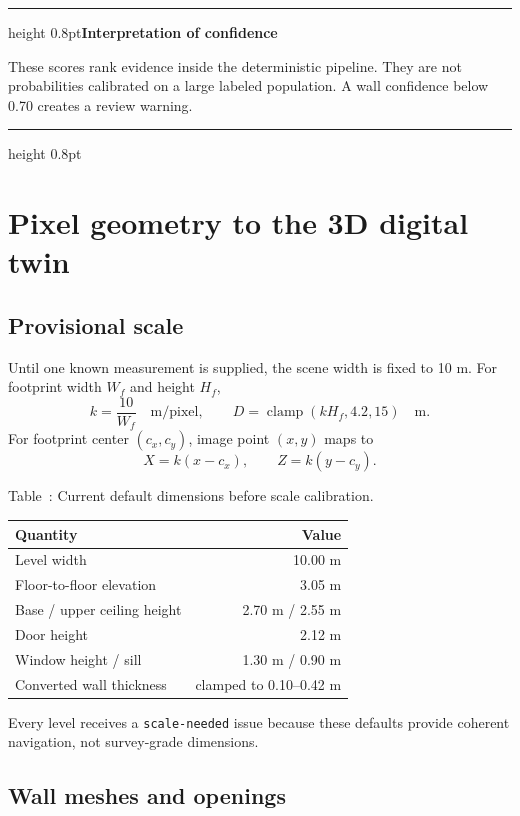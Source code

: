 \documentclass[11pt,a4paper]{article}
\newcommand{\code}[1]{\texttt{#1}}
\newcommand{\clamp}{\operatorname{clamp}}
\newenvironment{warningbox}[1]{
  \par\medskip\noindent\begin{minipage}{\textwidth}
  \color{Orange}\hrule height 0.8pt\vspace{1.6mm}\textbf{#1}\par\smallskip\color{Ink}
}{
  \vspace{1.3mm}\color{Orange}\hrule height 0.8pt\end{minipage}\par\medskip
}
\begin{document}
\begin{warningbox}{Interpretation of confidence}
These scores rank evidence inside the deterministic pipeline. They are not probabilities calibrated on a large labeled population. A wall confidence below 0.70 creates a review warning.
\end{warningbox}

\section{Pixel geometry to the 3D digital twin}

\subsection{Provisional scale}

Until one known measurement is supplied, the scene width is fixed to 10 m. For footprint width $W_f$ and height $H_f$,
\begin{equation}
k=\frac{10}{W_f}\quad\text{m/pixel},\qquad
D=\clamp(kH_f,4.2,15)\quad\text{m}.
\end{equation}
For footprint center $(c_x,c_y)$, image point $(x,y)$ maps to
\begin{equation}
X=k(x-c_x),\qquad Z=k(y-c_y).
\end{equation}

\begin{center}
Table~\thetable: Current default dimensions before scale calibration.
\end{center}
\begin{tabularx}{\textwidth}{@{}Xr@{}}
\toprule
Quantity & Value \\
\midrule
Level width & 10.00 m \\
Floor-to-floor elevation & 3.05 m \\
Base / upper ceiling height & 2.70 m / 2.55 m \\
Door height & 2.12 m \\
Window height / sill & 1.30 m / 0.90 m \\
Converted wall thickness & clamped to 0.10--0.42 m \\
\bottomrule
\end{tabularx}

Every level receives a \code{scale-needed} issue because these defaults provide coherent navigation, not survey-grade dimensions.

\subsection{Wall meshes and openings}
\end{document}
